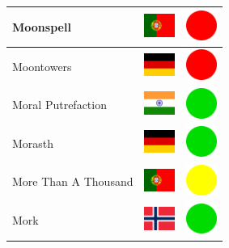 \documentclass[12pt, a4paper, twoside]{report}
\begin{document}
\begin{center}
\begin{longtable}{|p{5cm}|p{2cm}|p{2cm}|}
 Moonspell                                                  & \includegraphics[width=1cm]{../4x3/pt} &   \includegraphics[width=1cm]{../likes/n} \\ \hline
 Moontowers                                                 & \includegraphics[width=1cm]{../4x3/de} &   \includegraphics[width=1cm]{../likes/n} \\ \hline
 Moral Putrefaction                                         & \includegraphics[width=1cm]{../4x3/in} &   \includegraphics[width=1cm]{../likes/y} \\ \hline
 Morasth                                                    & \includegraphics[width=1cm]{../4x3/de} &   \includegraphics[width=1cm]{../likes/y} \\ \hline
 More Than A Thousand                                       & \includegraphics[width=1cm]{../4x3/pt} &   \includegraphics[width=1cm]{../likes/m} \\ \hline
 Mork                                                       & \includegraphics[width=1cm]{../4x3/no} &   \includegraphics[width=1cm]{../likes/y} \\ \hline

\end{longtable}
\end{center}
\end{document}
